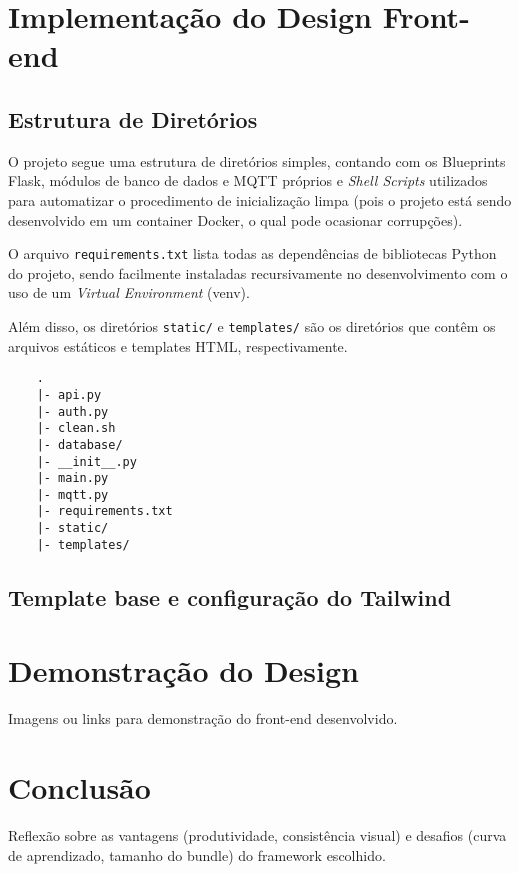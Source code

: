 \documentclass[11pt]{article}
\begin{document}
\section{Implementação do Design Front-end}

\subsection{Estrutura de Diretórios}

O projeto segue uma estrutura de diretórios simples, contando com os Blueprints Flask, módulos de banco de dados e MQTT próprios e \textit{Shell Scripts} utilizados para automatizar o procedimento de inicialização limpa (pois o projeto está sendo desenvolvido em um container Docker, o qual pode ocasionar corrupções).

O arquivo \texttt{requirements.txt} lista todas as dependências de bibliotecas Python do projeto, sendo facilmente instaladas recursivamente no desenvolvimento com o uso de um \textit{Virtual Environment} (venv).

Além disso, os diretórios \texttt{static/} e \texttt{templates/} são os diretórios que contêm os arquivos estáticos e templates HTML, respectivamente.

\begin{verbatim}
    .
    |- api.py
    |- auth.py
    |- clean.sh
    |- database/
    |- __init__.py
    |- main.py
    |- mqtt.py
    |- requirements.txt
    |- static/
    |- templates/

\end{verbatim}

\subsection{Template base e configuração do Tailwind}

\section{Demonstração do Design}

Imagens ou links para demonstração do front-end desenvolvido.

\section{Conclusão}

Reflexão sobre as vantagens (produtividade, consistência visual) e desafios (curva de aprendizado, tamanho do bundle) do framework escolhido.

% 
% 
\end{document}
